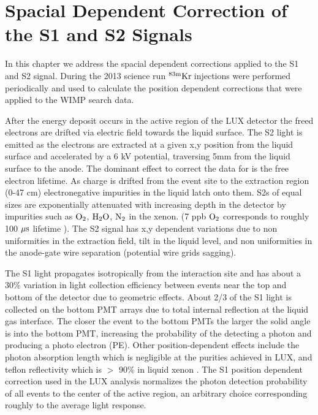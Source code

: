 
\renewcommand{\thechapter}{3}
\newcommand{\KrCal}{$\rm^{83m}Kr \: $}
\newcommand{\Rb}{$\rm^{83}Rb \: $}

\chapter{Spacial Dependent Correction of the S1 and S2 Signals}
\label{Ch:3}

In this chapter we address the spacial dependent corrections applied to the S1 and S2 signal. During the 2013 science run \KrCal injections were performed periodically and used to calculate the position dependent corrections that were applied to the WIMP search data.


After the energy deposit occurs in the active region of the LUX detector the freed electrons are drifted via electric field towards the liquid surface. The S2 light is emitted as the electrons are extracted at a given x,y position from the liquid surface and accelerated by a 6 kV potential, traversing 5mm from the liquid surface to the anode. The dominant effect to correct the data for is the free electron lifetime. As charge is drifted from the event site to the extraction region (0-47 cm) electronegative impurities in the liquid latch onto them. S2s of equal sizes are exponentially attenuated with increasing depth in the detector by impurities such as $\rm O_2$, $\rm H_2O$, $\rm N_2$ in the xenon. (7 ppb $\rm O_2$ corresponds to roughly 100 $\rm \mu s$ lifetime \cite{GPM}). The S2 signal has x,y dependent variations due to non uniformities in the extraction field, tilt in the liquid level, and non uniformities in the anode-gate wire separation (potential wire grids sagging). 


The S1 light propagates isotropically from the interaction site and has about a 30\% variation in light collection efficiency between events near the top and bottom of the detector due to geometric effects. About 2/3 of the S1 light is collected on the bottom PMT arrays due to total internal reflection at the liquid gas interface. The closer the event to the bottom PMTs the larger the solid angle is into the bottom PMT, increasing the probability of the detecting a photon and producing a photo electron (PE). Other position-dependent effects include the photon absorption length which is negligible at the purities achieved in LUX, and teflon reflectivity which is $>$ 90\% in liquid xenon \cite{Teflon_R_1} \cite{Teflon_R_2}. The S1 position dependent correction used in the LUX analysis normalizes the photon detection probability of all events to the center of the active region, an arbitrary choice corresponding roughly to the average light response.

